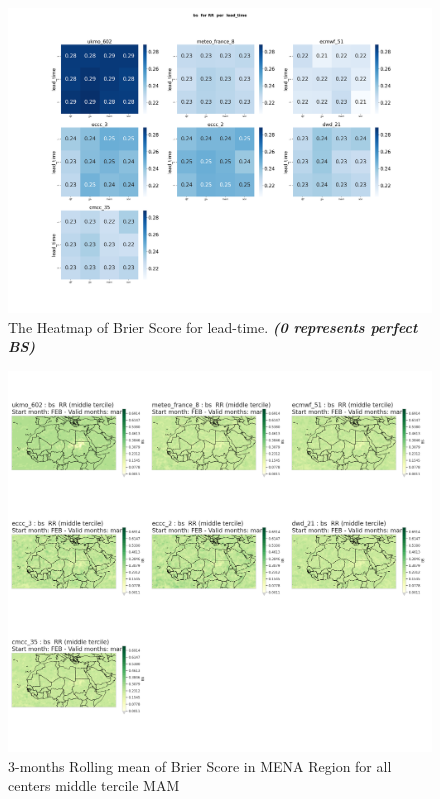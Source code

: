 \begin{figure}[H]
    \centering
    \includegraphics[scale=0.25]{plots/prob/bs/bs_RR_lead_time.png}
    \caption{The Heatmap of Brier Score for lead-time. \textbf{\textit{(0 represents perfect BS)}}}
\end{figure}


\begin{figure}[H]
\includegraphics[scale=0.3]{plots/prob/bs/bs_mam_RR_middle.png}
\caption{3-months Rolling mean of Brier Score in MENA Region for all centers middle tercile MAM}
\end{figure}

